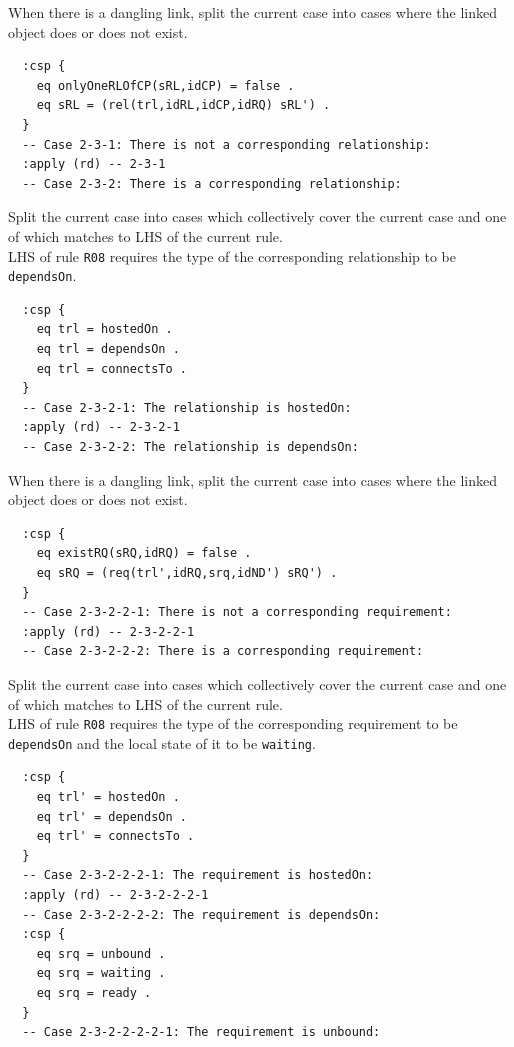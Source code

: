 \documentclass[12pt]{report}
\begin{document}
 When there is a dangling link, split the
current case into cases where the linked object does or does not
exist.
\small
\begin{verbatim}
  :csp {
    eq onlyOneRLOfCP(sRL,idCP) = false .
    eq sRL = (rel(trl,idRL,idCP,idRQ) sRL') .
  }
  -- Case 2-3-1: There is not a corresponding relationship:
  :apply (rd) -- 2-3-1
  -- Case 2-3-2: There is a corresponding relationship:
\end{verbatim}
\normalsize

 Split the current case into cases which
collectively cover the current case and one of which matches to LHS of
the current rule. \\
LHS of rule {\tt R08} requires the type of the corresponding relationship
to be {\tt dependsOn}.
\small
\begin{verbatim}
  :csp {
    eq trl = hostedOn .
    eq trl = dependsOn .
    eq trl = connectsTo .
  }
  -- Case 2-3-2-1: The relationship is hostedOn:
  :apply (rd) -- 2-3-2-1
  -- Case 2-3-2-2: The relationship is dependsOn:
\end{verbatim}
\normalsize

 When there is a dangling link, split the
current case into cases where the linked object does or does not
exist.
\small
\begin{verbatim}
  :csp {
    eq existRQ(sRQ,idRQ) = false .
    eq sRQ = (req(trl',idRQ,srq,idND') sRQ') .
  }
  -- Case 2-3-2-2-1: There is not a corresponding requirement:
  :apply (rd) -- 2-3-2-2-1
  -- Case 2-3-2-2-2: There is a corresponding requirement:
\end{verbatim}
\normalsize

 Split the current case into cases which
collectively cover the current case and one of which matches to LHS of
the current rule. \\
LHS of rule {\tt R08} requires the type of the corresponding requirement
to be {\tt dependsOn} and the local state of it to be {\tt waiting}.
\small
\begin{verbatim}
  :csp {
    eq trl' = hostedOn .
    eq trl' = dependsOn .
    eq trl' = connectsTo .
  }
  -- Case 2-3-2-2-2-1: The requirement is hostedOn:
  :apply (rd) -- 2-3-2-2-2-1
  -- Case 2-3-2-2-2-2: The requirement is dependsOn:
  :csp {
    eq srq = unbound .
    eq srq = waiting .
    eq srq = ready .
  }
  -- Case 2-3-2-2-2-2-1: The requirement is unbound:
\end{verbatim}
\normalsize
\end{document}
